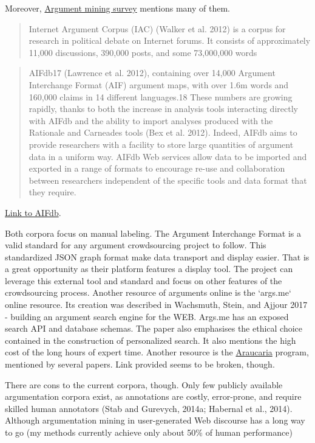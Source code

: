 \documentclass{article}
\begin{document}
Moreover, \href{https://direct.mit.edu/coli/article/45/4/765/93362/Argument-Mining-A-Survey}{Argument mining survey} mentions many of them.
\begin{quote}
 Internet Argument Corpus (IAC) (Walker et al. 2012) is a corpus for research in political debate on Internet forums. It consists of approximately 11,000 discussions, 390,000 posts, and some 73,000,000 words
\end{quote}
\begin{quote}
 AIFdb17 (Lawrence et al. 2012), containing over 14,000 Argument Interchange Format (AIF) argument maps, with over 1.6m words and 160,000 claims in 14 different languages.18 These numbers are growing rapidly, thanks to both the increase in analysis tools interacting directly with AIFdb and the ability to import analyses produced with the Rationale and Carneades tools (Bex et al. 2012). Indeed, AIFdb aims to provide researchers with a facility to store large quantities of argument data in a uniform way. AIFdb Web services allow data to be imported and exported in a range of formats to encourage re-use and collaboration between researchers independent of the specific tools and data format that they require.
\end{quote}
\href{https://corpora.aifdb.org/}{Link to AIFdb}.

Both corpora focus on manual labeling.
The Argument Interchange Format is a valid standard for any argument crowdsourcing project to follow.  This standardized JSON graph format make data transport and display easier. That is a great opportunity as their platform features a display tool.  The project can leverage this external tool and standard and focus on other features of the crowdsourcing process.
Another resource of arguments online is the `args.me` online resource. 
Its creation was described in Wachsmuth, Stein, and Ajjour 2017 - building an argument search engine for the WEB.
Args.me has an exposed search API and database schemas. The paper also emphasises the ethical choice contained in the construction of personalized search.
It also mentions the high cost of the long hours of expert time.
Another resource is the \href{http://araucaria.computing.dundee.ac.uk/}{Araucaria} program, mentioned by several papers. Link provided seems to be broken, though. 

There are cons to the current corpora, though.
Only few publicly available argumentation corpora exist, as annotations are costly, error-prone, and require skilled human annotators (Stab and Gurevych, 2014a; Habernal et al., 2014).
Although argumentation mining in user-generated Web discourse has a long way to go (my  methods currently achieve only about 50\% of human performance)
\end{document}
